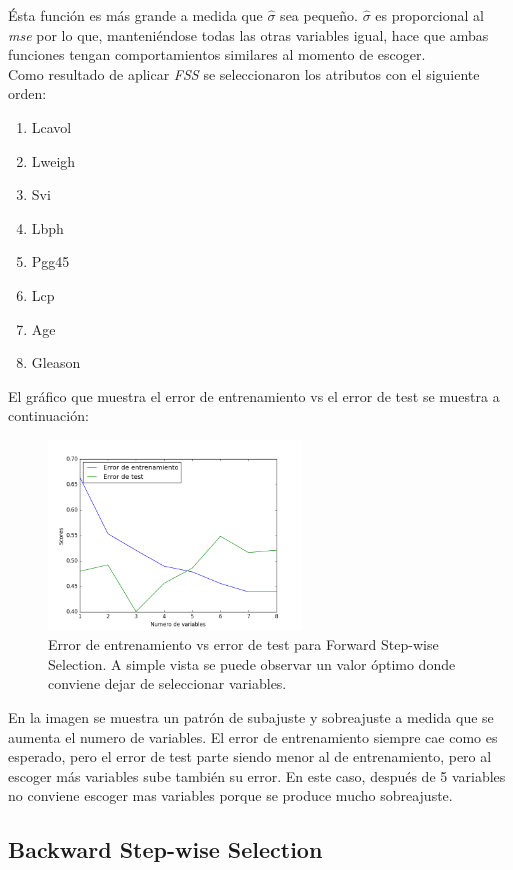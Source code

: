 \documentclass[letter, 10pt]{article}
\begin{document}
Ésta función es más grande a medida que $\hat{\sigma}$ sea pequeño. $\hat{\sigma}$
es proporcional al \textit{mse} por lo que, manteniéndose todas las otras
variables igual, hace que ambas funciones tengan comportamientos similares al
momento de escoger. \\

Como resultado de aplicar \textit{FSS} se seleccionaron los atributos con el
siguiente orden:
\begin{enumerate}
\item Lcavol 
\item Lweigh
\item Svi
\item Lbph
\item Pgg45
\item Lcp
\item Age
\item Gleason   
\end{enumerate}

El gráfico que muestra el error de entrenamiento vs el error de test se
muestra a continuación:

\begin{figure}[H]
  \centering
 \includegraphics[width=0.6\textwidth]{Images/p2_fig1.png} 
  \caption{Error de entrenamiento vs error de test para Forward Step-wise
    Selection. A simple vista se puede observar un valor óptimo donde conviene
    dejar de seleccionar variables. }
  \label{fig:p2_g1}
\end{figure}

En la imagen se muestra un patrón de subajuste y sobreajuste a medida que se
aumenta el numero de variables. El error de entrenamiento siempre cae como es
esperado, pero el error de test parte siendo menor al de entrenamiento, pero al
escoger más variables sube también su error. En este caso, después de 5
variables no conviene escoger mas variables porque se produce mucho sobreajuste.

\subsection{Backward Step-wise Selection}
\end{document}
